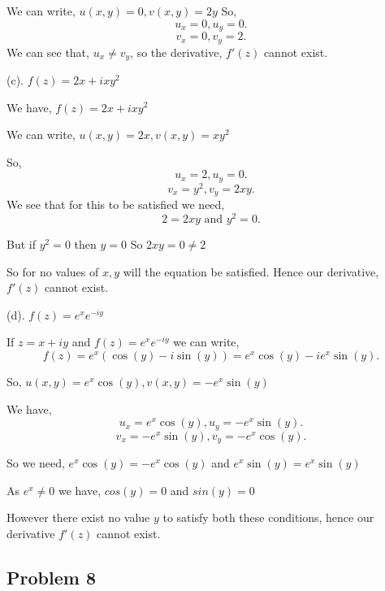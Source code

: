 \documentclass[a4paper]{report}
\begin{document}
We can write,  $u(x,y) = 0, v(x,y) =  2y$
So, 
 \[
    u_x = 0, u_y = 0
.\] 
\[
v_x = 0, v_y = 2
.\] 
We can see that, $u_x \neq v_y$, so the derivative, $f'(z)$ cannot exist.


(c). $f(z) = 2x + ixy^2$

We have, $f(z) = 2x + ixy^2$

We can write, $u(x,y) = 2x, v(x,y) = xy^2$

So, \[
u_x = 2, u_y = 0
.\]
\[
v_x = y^2, v_y = 2xy
.\] 
We see that for this to be satisfied we need, \[
    2 = 2xy \text{ and } y^2 = 0
.\] 

But if $y^2 = 0$ then $y = 0$ So  $2xy = 0 \neq 2$

So for no values of $x,y$ will the equation be satisfied. Hence our derivative,  $f'(z)$ cannot exist.

(d). $f(z) = e^x e^{-iy}$

If $z = x + iy$ and  $f(z) = e^x e^{-iy}$ we can write, \[
f(z) = e^x (\cos(y) - i\sin(y)) = e^x\cos(y) - ie^x\sin(y)
.\] 

So, $u(x,y) = e^x\cos(y), v(x,y) = -e^x\sin(y)$

We have, \[
u_x = e^x\cos(y), u_y = -e^x\sin(y)
.\] 
\[
v_x = -e^x\sin(y), v_y = -e^x\cos(y)
.\] 

So we need, $e^x\cos(y) = -e^x\cos(y)$ and $e^x\sin(y) = e^x\sin(y)$

As $e^x \neq 0$ we have, $cos(y) = 0$ and  $sin(y) = 0$

However there exist no value  $y$ to satisfy both these conditions, hence our derivative  $f'(z)$ cannot exist.


\subsection*{Problem 8}
\end{document}
